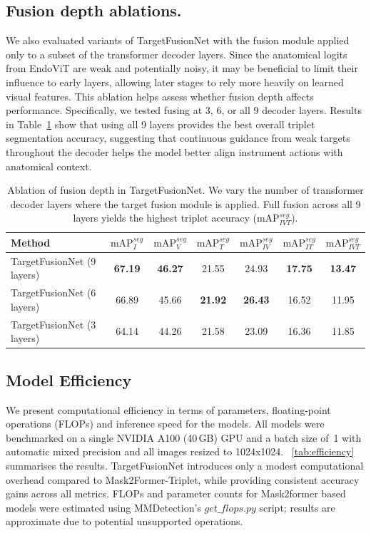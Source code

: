 \documentclass[11pt]{article}
\newcommand{\tabref}[1]{\tablename ~\ref{#1}}
\newcommand{\mAP}{\textrm{mAP}}
\begin{document}
\subsection {Fusion depth ablations.}
We also evaluated variants of TargetFusionNet with the fusion module applied only to a subset of the transformer decoder layers. Since the anatomical logits from EndoViT are weak and potentially noisy, it may be beneficial to limit their influence to early layers, allowing later stages to rely more heavily on learned visual features. This ablation helps assess whether fusion depth affects performance. Specifically, we tested fusing at 3, 6, or all 9 decoder layers.
Results in Table~\ref{tab:fusion_depth_results} show that using all 9 layers provides the best overall triplet segmentation accuracy, suggesting that continuous guidance from weak targets throughout the decoder helps the model better align instrument actions with anatomical context.


\begin{table}[t!]
\centering
\caption{Ablation of fusion depth in TargetFusionNet. We vary the number of transformer decoder layers where the target fusion module is applied. Full fusion across all 9 layers yields the highest triplet accuracy ($\mAP_{IVT}^{seg}$).}
\label{tab:fusion_depth_results}
\begin{tabular}{l|c|c|c|c|c|c}
\hline
\textbf{Method} & $\mAP_{I}^{seg}$ & $\mAP_{V}^{seg}$ & $\mAP_{T}^{seg}$ & $\mAP_{IV}^{seg}$ & $\mAP_{IT}^{seg}$ & $\mAP_{IVT}^{seg}$ \\
\hline
TargetFusionNet (9 layers) & \textbf{67.19} & \textbf{46.27 }& 21.55 & 24.93 & \textbf{17.75} & \textbf{13.47} \\
TargetFusionNet (6 layers) & 66.89 & 45.66 & \textbf{21.92} & \textbf{26.43} & 16.52 & 11.95 \\
TargetFusionNet (3 layers) & 64.14 & 44.26 & 21.58 & 23.09 & 16.36 & 11.85 \\
\hline
\end{tabular}
\end{table}



\subsection{Model Efficiency}
We present computational efficiency in terms of parameters, floating-point operations (FLOPs) and inference speed for the models. All models were benchmarked on a single NVIDIA A100 (40\,GB) GPU and a batch size of~1 with automatic mixed precision and all images resized to 1024x1024.
\tabref{tab:efficiency} summarises the results. TargetFusionNet introduces only a modest computational overhead compared to Mask2Former-Triplet, while providing consistent accuracy gains across all metrics. FLOPs and parameter counts for Mask2former based models were estimated using MMDetection’s $get\_flops.py$ script; results are approximate due to potential unsupported operations.
\end{document}
